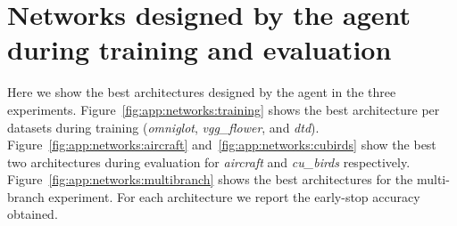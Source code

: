 \section{Networks designed by the agent during training and evaluation}\label{app:networks}

Here we show the best architectures designed by the agent in the three experiments. Figure~\ref{fig:app:networks:training} shows the best architecture per datasets during training (\textit{omniglot}, \textit{vgg\_flower}, and \textit{dtd}). Figure~\ref{fig:app:networks:aircraft} and~\ref{fig:app:networks:cubirds} show the best two architectures during evaluation for \textit{aircraft} and \textit{cu\_birds} respectively. Figure~\ref{fig:app:networks:multibranch} shows the best architectures for the multi-branch experiment. For each architecture we report the early-stop accuracy obtained.

